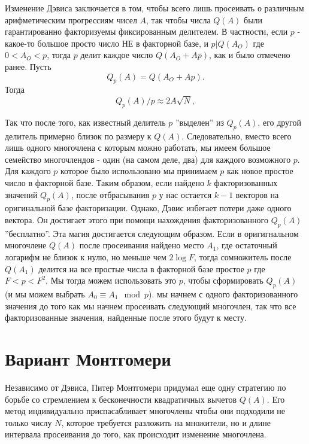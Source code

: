 \documentclass[russian, utf8, a4paper,12pt]{report}
\begin{document}
Изменение Дэвиса заключается в том, чтобы всего лишь просеивать о различным арифметическим прогрессиям чисел $A$, так чтобы числа $Q(A)$ были гарантированно факторизуемы фиксированным делителем. В частности, если $p$ - какое-то большое просто число НЕ в факторной базе, и $p | Q(A_O)$ где $0 < A_O < p$, тогда $p$ делит каждое число $Q(A_O + Ap)$, как и было отмечено ранее. Пусть
\begin{equation*}
Q_p(A) = Q(A_O + Ap).
\end{equation*}
Тогда
\begin{equation*}
Q_p(A)/p \approx 2A\sqrt{N},
\end{equation*}

Так что после того, как известный делитель $p$ ''выделен'' из $Q_p(A)$, его другой делитель примерно близок по размеру к $Q(A)$. Следовательно, вместо всего лишь одного многочлена с которым можно работать, мы имеем большое семейство многочлендов - один (на самом деле, два) для каждого возможного $p$. Для каждого $p$ которое было использовано мы принимаем $p$ как новое простое число в факторной базе. Таким образом, если найдено $k$ факторизованных значений $Q_p(A)$, после отбрасывания $p$ у нас остается $k-1$ векторов на оригинальной базе факторизации. Однако, Дэвис избегает потери даже одного вектора. Он достигает этого при помощи нахождения факторизованного $Q_p(A)$ ''бесплатно''. Эта магия достигается следующим образом. Если в оригигнальном многочлене $Q(A)$ после просеивания найдено место $A_1$, где остаточный логарифм не близок к нулю, но меньше чем $2 \log{F}$, тогда сомножитель после $Q(A_1)$ делится на все простые числа в факторной базе простое $p$ где $F < p < F^2$. Мы тогда можем использовать это $p$, чтобы сформировать $Q_p(A)$ (и мы можем выбрать $A_0 \equiv A_1 \mod p$). мы начнем с одного факторизованного значения до того как мы начнем просеивать следующий многочлен, так что все факторизованные значения, найденные после этого будут к месту.

\section{Вариант Монтгомери}

Независимо от Дэвиса, Питер Монтгомери \cite{mont} придумал еще одну стратегию по борьбе со стремлением к бесконечности квадратичных вычетов $Q(A)$. Его метод индивидуально приспасабливает многочлены чтобы они подходили не только числу $N$, которое требуется разложить на множители, но и длине интервала просеивания до того, как происходит изменение многочлена.
\end{document}
